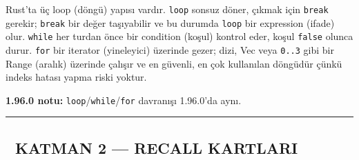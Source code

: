 \documentclass[12pt,a4paper]{article}
\begin{document}
Rust'ta üç loop (döngü) yapısı vardır. \texttt{loop} sonsuz döner, çıkmak için \texttt{break} gerekir; \texttt{break} bir değer taşıyabilir ve bu durumda \texttt{loop} bir expression (ifade) olur. \texttt{while} her turdan önce bir condition (koşul) kontrol eder, koşul \texttt{false} olunca durur. \texttt{for} bir iterator (yineleyici) üzerinde gezer; dizi, Vec veya \texttt{0..3} gibi bir Range (aralık) üzerinde çalışır ve en güvenli, en çok kullanılan döngüdür çünkü indeks hatası yapma riski yoktur.

\textbf{1.96.0 notu:} \texttt{loop}/\texttt{while}/\texttt{for} davranışı 1.96.0'da aynı.

\begin{center}\rule{0.5\linewidth}{0.5pt}\end{center}

\subsection{🔵 KATMAN 2 --- RECALL KARTLARI}\label{katman-2-—-recall-kartlari-8}
\end{document}
